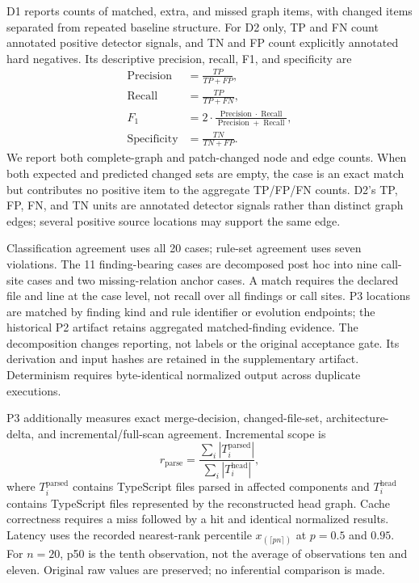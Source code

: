 D1 reports counts of matched, extra, and missed graph items, with changed items separated from repeated baseline structure. For D2 only, TP and FN count annotated positive detector signals, and TN and FP count explicitly annotated hard negatives. Its descriptive precision, recall, F1, and specificity are
\begin{align}
  \operatorname{Precision} &= \frac{TP}{TP+FP},\\
  \operatorname{Recall} &= \frac{TP}{TP+FN},\\
  F_1 &= 2\cdot\frac{\operatorname{Precision}\cdot\operatorname{Recall}}
  {\operatorname{Precision}+\operatorname{Recall}},\\
  \operatorname{Specificity} &= \frac{TN}{TN+FP}.
\end{align}
We report both complete-graph and patch-changed node and edge counts. When both expected and predicted changed sets are empty, the case is an exact match but contributes no positive item to the aggregate TP/FP/FN counts. D2's TP, FP, FN, and TN units are annotated detector signals rather than distinct graph edges; several positive source locations may support the same edge.

Classification agreement uses all 20 cases; rule-set agreement uses seven violations. The 11 finding-bearing cases are decomposed post hoc into nine call-site cases and two missing-relation anchor cases. A match requires the declared file and line at the case level, not recall over all findings or call sites. P3 locations are matched by finding kind and rule identifier or evolution endpoints; the historical P2 artifact retains aggregated matched-finding evidence. The decomposition changes reporting, not labels or the original acceptance gate. Its derivation and input hashes are retained in the supplementary artifact. Determinism requires byte-identical normalized output across duplicate executions.

P3 additionally measures exact merge-decision, changed-file-set, architecture-delta, and incremental/full-scan agreement. Incremental scope is
\begin{equation}
  r_{\mathrm{parse}}=\frac{\sum_i |T_i^{\mathrm{parsed}}|}{\sum_i |T_i^{\mathrm{head}}|},
\end{equation}
where $T_i^{\mathrm{parsed}}$ contains TypeScript files parsed in affected components and $T_i^{\mathrm{head}}$ contains TypeScript files represented by the reconstructed head graph. Cache correctness requires a miss followed by a hit and identical normalized results. Latency uses the recorded nearest-rank percentile $x_{(\lceil pn\rceil)}$ at $p=0.5$ and $0.95$. For $n=20$, p50 is the tenth observation, not the average of observations ten and eleven. Original raw values are preserved; no inferential comparison is made.

